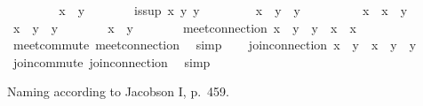 \begin{isabellebody}
\ \ \isamarkupfalse%
\isanewline
\ \ \ \ \isamarkupfalse%
\ {\isachardoublequoteopen}x\ {\isasymsqsubseteq}\ y{\isachardoublequoteclose}\isanewline
\ \ \ \ \isamarkupfalse%
\ \isamarkupfalse%
\ {\isachardoublequoteopen}is{\isacharunderscore}sup\ x\ y\ y{\isachardoublequoteclose}\ \isacommand{{\isachardot}{\isachardot}}\isamarkupfalse%
\isanewline
\ \ \ \ \isamarkupfalse%
\ \isamarkupfalse%
\ {\isachardoublequoteopen}x\ {\isasymsqunion}\ y\ {\isacharequal}\ y{\isachardoublequoteclose}\ \isacommand{{\isachardot}{\isachardot}}\isamarkupfalse%
\isanewline
\ \ \isamarkupfalse%
\isanewline
\ \ \ \ \isamarkupfalse%
\ {\isachardoublequoteopen}x\ {\isasymsqsubseteq}\ x\ {\isasymsqunion}\ y{\isachardoublequoteclose}\ \isacommand{{\isachardot}{\isachardot}}\isamarkupfalse%
\isanewline
\ \ \ \ \isamarkupfalse%
\ \isamarkupfalse%
\ {\isachardoublequoteopen}x\ {\isasymsqunion}\ y\ {\isacharequal}\ y{\isachardoublequoteclose}\isanewline
\ \ \ \ \isamarkupfalse%
\ \isamarkupfalse%
\ {\isachardoublequoteopen}x\ {\isasymsqsubseteq}\ y{\isachardoublequoteclose}\ \isacommand{{\isachardot}}\isamarkupfalse%
\isanewline
\ \ \isamarkupfalse%
\isanewline
\isanewline
\ \ \isamarkupfalse%
\ meet{\isacharunderscore}connection{}{\isacharcolon}\ {\isachardoublequoteopen}{\isacharparenleft}x\ {\isasymsqsubseteq}\ y{\isacharparenright}\ {\isacharequal}\ {\isacharparenleft}y\ {\isasymsqinter}\ x\ {\isacharequal}\ x{\isacharparenright}{\isachardoublequoteclose}\isanewline
\ \ \ \ \isamarkupfalse%
\ meet{\isacharunderscore}commute\ meet{\isacharunderscore}connection\ \isamarkupfalse%
\ simp\isanewline
\isanewline
\ \ \isamarkupfalse%
\ join{\isacharunderscore}connection{}{\isacharcolon}\ {\isachardoublequoteopen}{\isacharparenleft}x\ {\isasymsqsubseteq}\ y{\isacharparenright}\ {\isacharequal}\ {\isacharparenleft}x\ {\isasymsqunion}\ y\ {\isacharequal}\ y{\isacharparenright}{\isachardoublequoteclose}\isanewline
\ \ \ \ \isamarkupfalse%
\ join{\isacharunderscore}commute\ join{\isacharunderscore}connection\ \isamarkupfalse%
\ simp%
\begin{isamarkuptext}%
Naming according to Jacobson I, p.\ 459.%
\end{isamarkuptext}%
\isamarkuptrue%
\ \ \isamarkupfalse%

\end{isabellebody}
